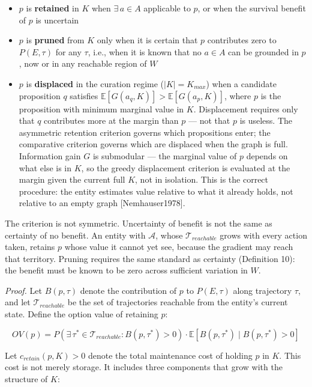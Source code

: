 \documentclass[
]{article}
\providecommand{\tightlist}{%
  \setlength{\itemsep}{0pt}\setlength{\parskip}{0pt}}
\begin{document}
\begin{itemize}
\tightlist
\item
  \(p\) is \textbf{retained} in \(K\) when \(\exists\, a \in A\)
  applicable to \(p\), or when the survival benefit of \(p\) is
  uncertain
\item
  \(p\) is \textbf{pruned} from \(K\) only when it is certain that \(p\)
  contributes zero to \(P(E, \tau)\) for any \(\tau\), i.e., when it is
  known that no \(a \in A\) can be grounded in \(p\), now or in any
  reachable region of \(W\)
\item
  \(p\) is \textbf{displaced} in the curation regime (\(|K| = K_{max}\))
  when a candidate proposition \(q\) satisfies
  \(\mathbb{E}[G(a_q, K)] > \mathbb{E}[G(a_p, K)]\), where \(p\) is the
  proposition with minimum marginal value in \(K\). Displacement
  requires only that \(q\) contributes more at the margin than \(p\) ---
  not that \(p\) is useless. The asymmetric retention criterion governs
  which propositions enter; the comparative criterion governs which are
  displaced when the graph is full. Information gain \(G\) is submodular
  --- the marginal value of \(p\) depends on what else is in \(K\), so
  the greedy displacement criterion is evaluated at the margin given the
  current full \(K\), not in isolation. This is the correct procedure:
  the entity estimates value relative to what it already holds, not
  relative to an empty graph {[}Nemhauser1978{]}.
\end{itemize}

The criterion is not symmetric. Uncertainty of benefit is not the same
as certainty of no benefit. An entity with \(\mathcal{A}\), whose
\(\mathcal{T}_{reachable}\) grows with every action taken, retains \(p\)
whose value it cannot yet see, because the gradient may reach that
territory. Pruning requires the same standard as certainty (Definition
10): the benefit must be known to be zero across sufficient variation in
\(W\).

\emph{Proof.} Let \(B(p, \tau)\) denote the contribution of \(p\) to
\(P(E, \tau)\) along trajectory \(\tau\), and let
\(\mathcal{T}_{reachable}\) be the set of trajectories reachable from
the entity's current state. Define the option value of retaining \(p\):

\[OV(p) = P\!\left(\exists\,\tau^* \in \mathcal{T}_{reachable} : B(p, \tau^*) > 0\right) \cdot \mathbb{E}\!\left[B(p,\tau^*) \mid B(p, \tau^*) > 0\right]\]

Let \(c_{retain}(p, K) > 0\) denote the total maintenance cost of
holding \(p\) in \(K\). This cost is not merely storage. It includes
three components that grow with the structure of \(K\):
\end{document}
